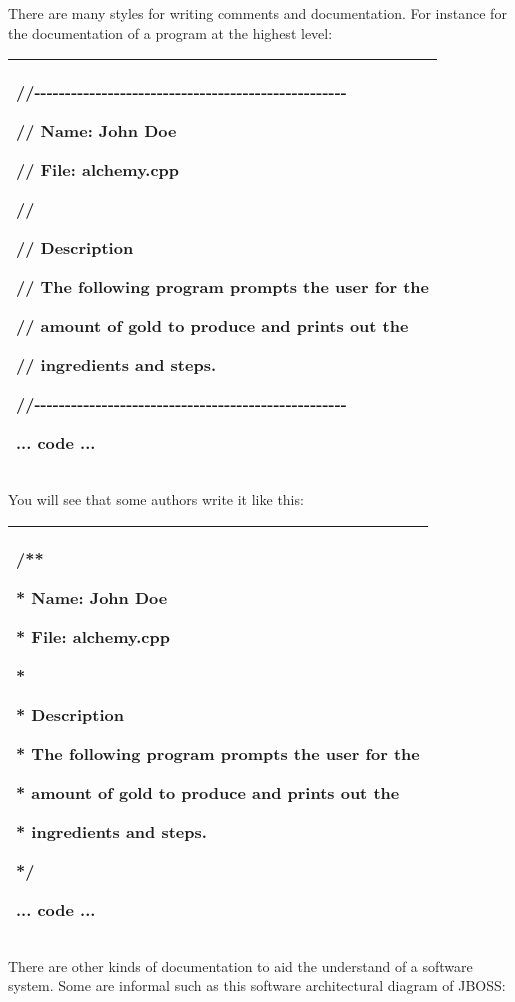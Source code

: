 \documentclass[
]{article}
\begin{document}
There are many styles for writing comments and documentation. For
instance for the documentation of a program at the highest level:

\begin{longtable}[]{@{}l@{}}
\toprule
\endhead
\begin{minipage}[t]{0.97\columnwidth}\raggedright
//-\/-\/-\/-\/-\/-\/-\/-\/-\/-\/-\/-\/-\/-\/-\/-\/-\/-\/-\/-\/-\/-\/-\/-\/-\/-\/-\/-\/-\/-\/-\/-\/-\/-\/-\/-\/-\/-\/-\/-\/-\/-\/-\/-\/-\/-\/-\/-\/-\/-\/-

// Name: John Doe

// File: alchemy.cpp

//

// Description

// The following program prompts the user for the

// amount of gold to produce and prints out the

// ingredients and steps.

//-\/-\/-\/-\/-\/-\/-\/-\/-\/-\/-\/-\/-\/-\/-\/-\/-\/-\/-\/-\/-\/-\/-\/-\/-\/-\/-\/-\/-\/-\/-\/-\/-\/-\/-\/-\/-\/-\/-\/-\/-\/-\/-\/-\/-\/-\/-\/-\/-\/-\/-

... code ...\strut
\end{minipage}\tabularnewline
\bottomrule
\end{longtable}

You will see that some authors write it like this:

\begin{longtable}[]{@{}l@{}}
\toprule
\endhead
\begin{minipage}[t]{0.97\columnwidth}\raggedright
/**

* Name: John Doe

* File: alchemy.cpp

*

* Description

* The following program prompts the user for the

* amount of gold to produce and prints out the

* ingredients and steps.

*/

... code ...\strut
\end{minipage}\tabularnewline
\bottomrule
\end{longtable}

There are other kinds of documentation to aid the understand of a
software system. Some are informal such as this software architectural
diagram of JBOSS:
\end{document}
